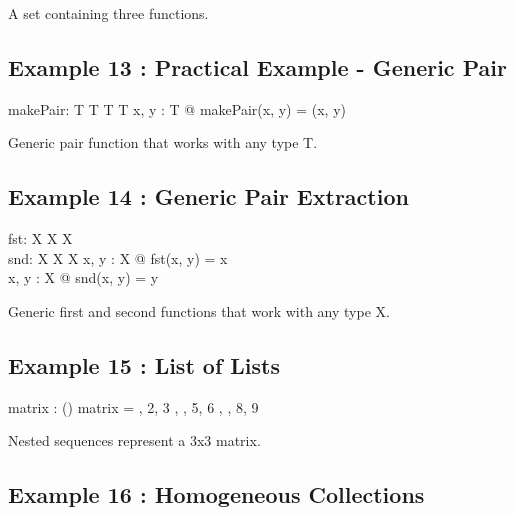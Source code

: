 \documentclass[a4paper,10pt,fleqn]{article}
\begin{document}
\noindent A set containing three functions.

\bigskip

\subsection*{Example 13 : Practical Example - Generic Pair}

\begin{gendef}[T]
  makePair: T \cross T \fun T \cross T
\where
  \forall x, y : T @ makePair(x, y) = (x, y)
\end{gendef}

\noindent Generic pair function that works with any type T.

\bigskip

\subsection*{Example 14 : Generic Pair Extraction}

\begin{gendef}[X]
  fst: X \cross X \fun X \\
  snd: X \cross X \fun X
\where
  \forall x, y : X @ fst(x, y) = x \\
  \forall x, y : X @ snd(x, y) = y
\end{gendef}

\noindent Generic first and second functions that work with any type X.

\bigskip

\subsection*{Example 15 : List of Lists}

\begin{axdef}
matrix : \seq (\seq \nat)
\where
matrix = \langle {}, 2, 3 \rangle, , 5, 6 \rangle, , 8, 9 \rangle \rangle
\end{axdef}

\noindent Nested sequences represent a 3x3 matrix.

\bigskip

\subsection*{Example 16 : Homogeneous Collections}
\end{document}
